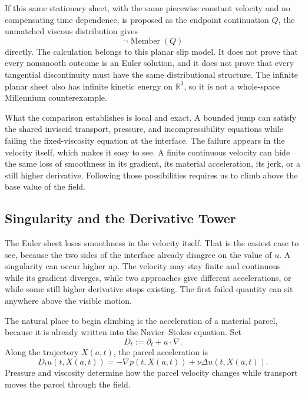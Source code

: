 If this same stationary sheet, with the same piecewise constant velocity and no compensating time dependence, is proposed as the endpoint continuation \(Q\), the unmatched viscous distribution gives
\[
  \neg\operatorname{Member}(Q)
\]
directly.
The calculation belongs to this planar slip model.
It does not prove that every nonsmooth outcome is an Euler solution, and it does not prove that every tangential discontinuity must have the same distributional structure.
The infinite planar sheet also has infinite kinetic energy on \(\mathbb R^3\), so it is not a whole-space Millennium counterexample.

What the comparison establishes is local and exact.
A bounded jump can satisfy the shared inviscid transport, pressure, and incompressibility equations while failing the fixed-viscosity equation at the interface.
The failure appears in the velocity itself, which makes it easy to see.
A finite continuous velocity can hide the same loss of smoothness in its gradient, its material acceleration, its jerk, or a still higher derivative.
Following those possibilities requires us to climb above the base value of the field.

\subsection{Singularity and the Derivative Tower}\label{sub:SingularityAndTheDerivativeTower}

The Euler sheet loses smoothness in the velocity itself.
That is the easiest case to see, because the two sides of the interface already disagree on the value of \(u\).
A singularity can occur higher up.
The velocity may stay finite and continuous while its gradient diverges, while two approaches give different accelerations, or while some still higher derivative stops existing.
The first failed quantity can sit anywhere above the visible motion.

The natural place to begin climbing is the acceleration of a material parcel, because it is already written into the Navier--Stokes equation.
Set
\[
  D_t:=\partial_t+u\cdot\nabla.
\]
Along the trajectory \(X(a,t)\), the parcel acceleration is
\[
  D_tu(t,X(a,t))
  =
  -\nabla p(t,X(a,t))
  +\nu\Delta u(t,X(a,t)).
\]
Pressure and viscosity determine how the parcel velocity changes while transport moves the parcel through the field.

